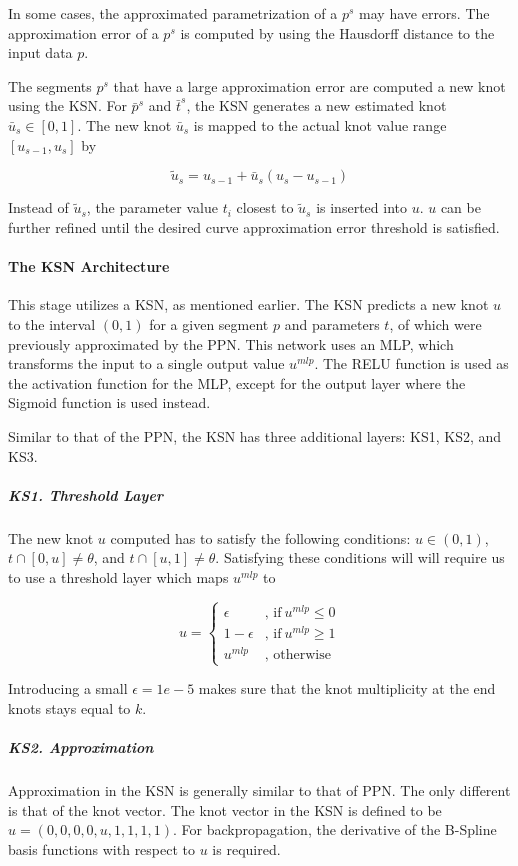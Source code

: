 In some cases, the approximated parametrization of a $p^{s}$ may have errors. The approximation error of a $p^{s}$ is computed by using the Hausdorff distance to the input data $p$.

The segments $p^{s}$ that have a large approximation error are computed a new knot using the KSN. For $\bar{p}^{s}$ and $\bar{t}^{s}$, the KSN generates a new estimated knot $\bar{u}_{s} \in [0, 1]$. The new knot $\bar{u}_{s}$ is mapped to the actual knot value range $[u_{s - 1}, u_{s}]$ by

$$ \tilde{u}_{s} = u_{s - 1} + \bar{u}_{s}(u_{s} - u_{s - 1}) $$

Instead of $\tilde{u}_{s}$, the parameter value $t_{i}$ closest to $\tilde{u}_{s}$ is inserted into $u$. $u$ can be further refined until the desired curve approximation error threshold is satisfied.

\paragraph{The KSN Architecture}
This stage utilizes a KSN, as mentioned earlier. The KSN predicts a new knot $u$ to the interval $(0, 1)$ for a given segment $p$ and parameters $t$, of which were previously approximated by the PPN. This network uses an MLP, which transforms the input to a single output value $u^{mlp}$. The RELU function is used as the activation function for the MLP, except for the output layer where the Sigmoid function is used instead.

Similar to that of the PPN, the KSN has three additional layers: KS1, KS2, and KS3.

\subparagraph{KS1. Threshold Layer}
The new knot $u$ computed has to satisfy the following conditions: $u \in (0, 1)$, $t \cap [0, u] \neq \theta$, and $t \cap [u, 1] \neq \theta$. Satisfying these conditions will will require us to use a threshold layer which maps $u^{mlp}$ to

$$ u = \begin{cases} \epsilon&\text{, if}\:u^{mlp} \le 0 \\ 1 - \epsilon&\text{, if}\:u^{mlp} \ge 1 \\ u^{mlp}&\text{, otherwise} \end{cases} $$

Introducing a small $\epsilon = 1e - 5$ makes sure that the knot multiplicity at the end knots stays equal to $k$.

\subparagraph{KS2. Approximation}
Approximation in the KSN is generally similar to that of PPN. The only different is that of the knot vector. The knot vector in the KSN is defined to be $u = (0, 0, 0, 0, u, 1, 1, 1, 1)$. For backpropagation, the derivative of the B-Spline basis functions with respect to $u$ is required.

